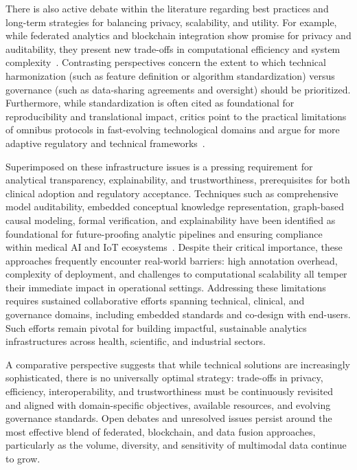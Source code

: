 \documentclass[sigconf]{acmart}
\begin{document}
There is also active debate within the literature regarding best practices and long-term strategies for balancing privacy, scalability, and utility. For example, while federated analytics and blockchain integration show promise for privacy and auditability, they present new trade-offs in computational efficiency and system complexity~\cite{ref51,ref106,ref44,ref90}. Contrasting perspectives concern the extent to which technical harmonization (such as feature definition or algorithm standardization) versus governance (such as data-sharing agreements and oversight) should be prioritized. Furthermore, while standardization is often cited as foundational for reproducibility and translational impact, critics point to the practical limitations of omnibus protocols in fast-evolving technological domains and argue for more adaptive regulatory and technical frameworks~\cite{ref4,ref41,ref54,ref84}.

Superimposed on these infrastructure issues is a pressing requirement for analytical transparency, explainability, and trustworthiness, prerequisites for both clinical adoption and regulatory acceptance. Techniques such as comprehensive model auditability, embedded conceptual knowledge representation, graph-based causal modeling, formal verification, and explainability have been identified as foundational for future-proofing analytic pipelines and ensuring compliance within medical AI and IoT ecosystems~\cite{ref107,ref54,ref70,ref65}. Despite their critical importance, these approaches frequently encounter real-world barriers: high annotation overhead, complexity of deployment, and challenges to computational scalability all temper their immediate impact in operational settings. Addressing these limitations requires sustained collaborative efforts spanning technical, clinical, and governance domains, including embedded standards and co-design with end-users. Such efforts remain pivotal for building impactful, sustainable analytics infrastructures across health, scientific, and industrial sectors.

A comparative perspective suggests that while technical solutions are increasingly sophisticated, there is no universally optimal strategy: trade-offs in privacy, efficiency, interoperability, and trustworthiness must be continuously revisited and aligned with domain-specific objectives, available resources, and evolving governance standards. Open debates and unresolved issues persist around the most effective blend of federated, blockchain, and data fusion approaches, particularly as the volume, diversity, and sensitivity of multimodal data continue to grow.
\end{document}
